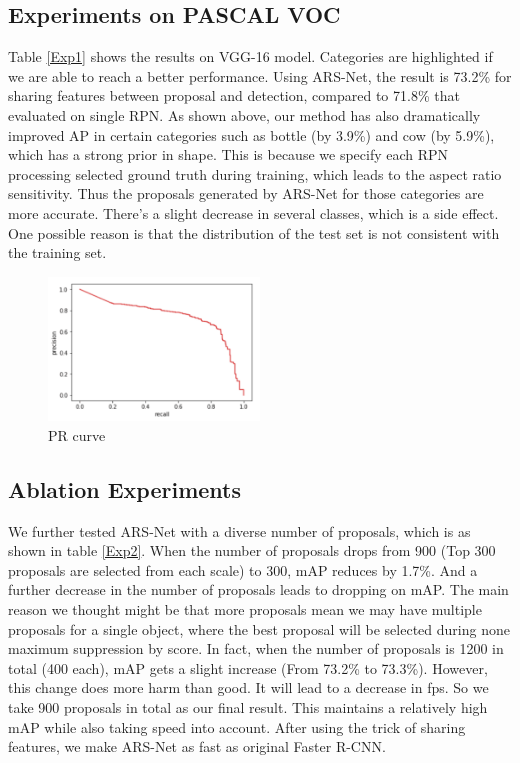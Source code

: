 \documentclass[10pt,twocolumn,letterpaper]{article}
\begin{document}
\subsection{Experiments on PASCAL VOC}
\indent{} Table \ref{Exp1} shows the results on VGG-16\cite{vgg} model. Categories are highlighted if we are able to reach a better performance. Using ARS-Net, the result is 73.2\% for sharing features between proposal and detection, compared to 71.8\% that evaluated on single RPN. As shown above, our method has also dramatically improved AP in certain categories such as bottle (by 3.9\%) and cow (by 5.9\%), which has a strong prior in shape. This is because we specify each RPN processing selected ground truth during training, which leads to the aspect ratio sensitivity. Thus the proposals generated by ARS-Net for those categories are more accurate. There's a slight decrease in several classes, which is a side effect. One possible reason is that the distribution of the test set is not consistent with the training set.
    \begin{figure}[!htb]
    \includegraphics[width= 0.5\textwidth]{pic/precision_per_recall.png}
    \caption{PR curve}
    \label{prcurve}
    \end{figure}
    
\subsection{Ablation Experiments}
We further tested ARS-Net with a diverse number of proposals, which is as shown in table \ref{Exp2}. When the number of proposals drops from 900 (Top 300 proposals are selected from each scale) to 300, mAP reduces by 1.7\%. And a further decrease in the number of proposals leads to dropping on mAP. The main reason we thought might be that more proposals mean we may have multiple proposals for a single object, where the best proposal will be selected during none maximum suppression by score. In fact, when the number of proposals is 1200 in total (400 each), mAP gets a slight increase (From 73.2\% to 73.3\%). However, this change does more harm than good. It will lead to a decrease in fps. So we take 900 proposals in total as our final result. This maintains a relatively high mAP while also taking speed into account. After using the trick of sharing features, we make ARS-Net as fast as original Faster R-CNN.
\end{document}
